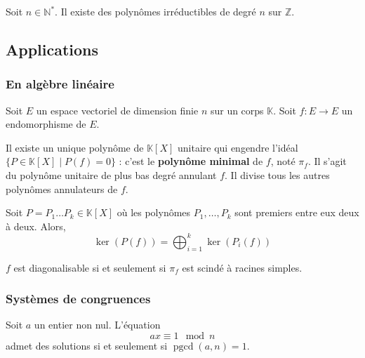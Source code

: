 
  \begin{application}
    Soit $n \in \mathbb{N}^*$. Il existe des polynômes irréductibles de degré $n$ sur $\mathbb{Z}$.
  \end{application}

  \subsection{Applications}

  \subsubsection{En algèbre linéaire}

  Soit $E$ un espace vectoriel de dimension finie $n$ sur un corps $\mathbb{K}$. Soit $f : E \rightarrow E$ un endomorphisme de $E$.


  \begin{proposition}
    Il existe un unique polynôme de $\mathbb{K}[X]$ unitaire qui engendre l'idéal $\{ P \in \mathbb{K}[X] \mid P(f) = 0 \}$ : c'est le \textbf{polynôme minimal} de $f$, noté $\pi_f$. Il s'agit du polynôme unitaire de plus bas degré annulant $f$. Il divise tous les autres polynômes annulateurs de $f$.
  \end{proposition}

  \begin{theorem}
    Soit $P = P_1 \dots P_k \in \mathbb{K}[X]$ où les polynômes $P_1, \dots, P_k$ sont premiers entre eux deux à deux. Alors,
    \[ \ker(P(f)) = \bigoplus_{i=1}^k \ker(P_i(f)) \]
  \end{theorem}

  \begin{application}
    $f$ est diagonalisable si et seulement si $\pi_f$ est scindé à racines simples.
  \end{application}

  \subsubsection{Systèmes de congruences}


  \begin{proposition}
    Soit $a$ un entier non nul. L'équation
    \[ ax \equiv 1 \mod n \]
    admet des solutions si et seulement si $\operatorname{pgcd}(a,n) = 1$.
  \end{proposition}

